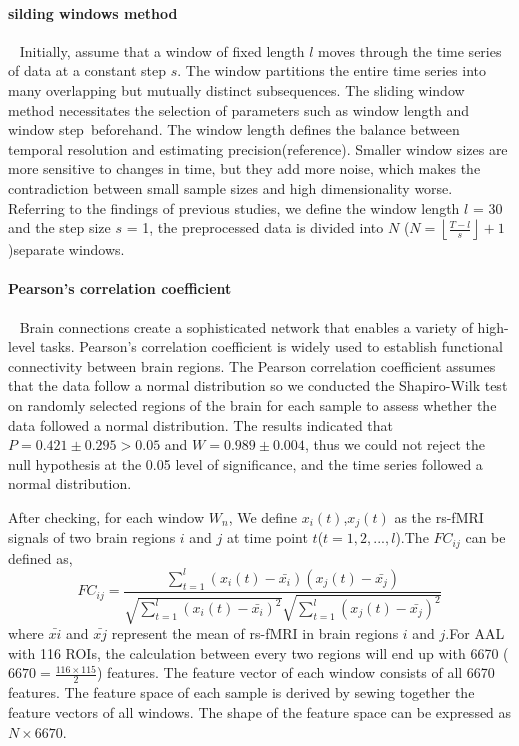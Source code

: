 \documentclass[a4paper]{cas-dc}
\begin{document}
\paragraph{silding windows method}~{}
\newline
\indent Initially, assume that a window of fixed length $l$ moves through the time series of data at a constant step $s$. The window partitions the entire time series into many overlapping but mutually distinct subsequences. The sliding window method necessitates the selection of parameters such as window length and window step beforehand. The window length defines the balance between temporal resolution and estimating precision(reference). Smaller window sizes are more sensitive to changes in time, but they add more noise, which makes the contradiction between small sample sizes and high dimensionality worse. Referring to the findings of previous studies, we define the window length $l$ = 30 and the step size $s$ = 1, the preprocessed data is divided into $N$ ($N = \left \lfloor \frac{T - l}{s} \right \rfloor + 1$)separate windows.
\paragraph{Pearson's correlation coefficient}~{}
\newline
\indent Brain connections create a sophisticated network that enables a variety of high-level tasks. Pearson's correlation coefficient is widely used to establish functional connectivity between brain regions. The Pearson correlation coefficient assumes that the data follow a normal distribution so we conducted the Shapiro-Wilk test on randomly selected regions of the brain for each sample to assess whether the data followed a normal distribution. The results indicated that $P=0.421\pm 0.295>0.05$ and $W=0.989\pm 0.004$, thus we could not reject the null hypothesis at the 0.05 level of significance, and the time series followed a normal distribution.

After checking, for each window $W_n$, We define $x_{i}(t)$,$x_{j}(t)$ as the rs-fMRI signals of two brain regions $i$ and $j$ at time point $t$($t = 1,2,...,l$).The $FC_{ij}$ can be defined as,
\begin{equation}
	FC_{ij}=\frac{\sum_{t=1}^{l}(x_{i}(t)-\bar{x_{i}})(x_{j}(t)-\bar{x_{j}})}{\sqrt{\sum_{t=1}^{l}(x_{i}(t)-\bar{x_{i}})^2}\sqrt{\sum_{t=1}^{l}(x_{j}(t)-\bar{x_{j}})^2}}
\end{equation}
where $\bar{x{i}}$ and $\bar{x{j}}$ represent the mean of rs-fMRI in brain regions $i$ and $j$.For AAL with 116 ROIs, the calculation between every two regions will end up with 6670 ($6670=\frac{116\times115}{2}$) features. The feature vector of each window consists of all 6670 features. The feature space of each sample is derived by sewing together the feature vectors of all windows. The shape of the feature space can be expressed as $N\times 6670$.
\end{document}
